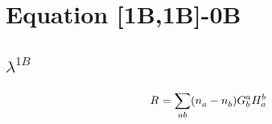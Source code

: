 \documentclass{scrartcl}
\begin{document}
    
\section{Equation [1B,1B]-0B}
\subsection{$\lambda^{1B}$}
\begin{dmath*}
R^{}_{} = \sum_{ab} (n^{}_{a}-n^{}_{b}) \* G^{a}_{b} \* H^{b}_{a}
\end{dmath*}
\end{document}
